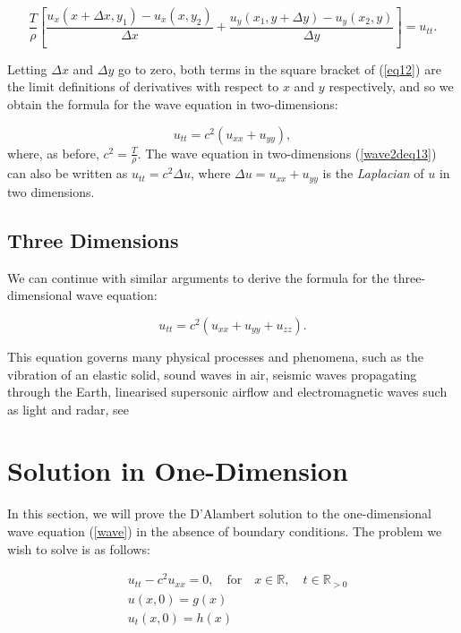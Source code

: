 \documentclass[a4paper, 12pt]{article}
\numberwithin{equation}{section}
\begin{document}
\begin{equation} \label{eq12}
    \frac{T}{\rho}\left[\frac{u_x(x+\Delta x, y_1)-u_x(x,y_2)}{\Delta x}+\frac{u_y(x_1,y+ \Delta y)-u_y(x_2,y)}{\Delta y}\right]=u_{tt}.
\end{equation}

Letting $\Delta x$ and $\Delta y$ go to zero, both terms in the square bracket of (\ref{eq12}) are the limit definitions of derivatives with
respect to $x$ and $y$ respectively, and so we obtain the formula for the wave equation in two-dimensions:

\begin{equation} \label{wave2deq13}
    u_{tt}=c^2(u_{xx}+u_{yy}),
\end{equation}
where, as before, $c^2=\frac{T}{\rho}$. The wave equation in two-dimensions (\ref{wave2deq13}) can also be written as $u_{tt}=c^2\Delta u$, 
where $\Delta u=u_{xx}+u_{yy}$ is the \emph{Laplacian} of $u$ in two dimensions.

\subsection{Three Dimensions}
We can continue with similar arguments to derive the formula for the three-dimensional wave equation:

\begin {equation} \label{wave3deq14}
    u_{tt}=c^2(u_{xx}+u_{yy}+u_{zz}).
\end{equation}

This equation governs many physical processes and phenomena, such as the vibration of an elastic solid, 
sound waves in air, seismic waves propagating through the Earth, linearised supersonic airflow and electromagnetic waves such as light and radar, see
\cite{Str}

\section{Solution in One-Dimension}
In this section, we will prove the D'Alambert solution to the one-dimensional wave equation (\ref{wave}) 
in the absence of boundary conditions. The problem we wish to solve is as follows:

\begin{equation} \label{ivp1d}
    \begin{aligned}
    &u_{tt}-c^2u_{xx}=0, \quad \textrm{for} \quad x\in \mathbb{R},\quad t\in \mathbb{R}_{>0}\\
    &u(x,0)=g(x)\\
    &u_t(x,0)=h(x)
    \end{aligned}
\end{equation}
\end{document}
